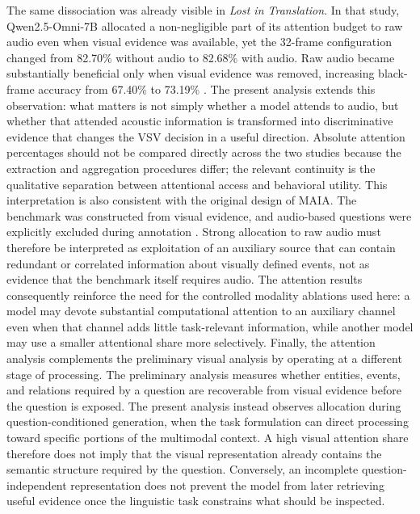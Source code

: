 The same dissociation was already visible in \textit{Lost in Translation}. In that study, Qwen2.5-Omni-7B allocated a non-negligible part of its attention budget to raw audio even when visual evidence was available, yet the 32-frame configuration changed from 82.70\% without audio to 82.68\% with audio. Raw audio became substantially beneficial only when visual evidence was removed, increasing black-frame accuracy from 67.40\% to 73.19\% \cite{deodati2026lost}. The present analysis extends this observation: what matters is not simply whether a model attends to audio, but whether that attended acoustic information is transformed into discriminative evidence that changes the VSV decision in a useful direction. Absolute attention percentages should not be compared directly across the two studies because the extraction and aggregation procedures differ; the relevant continuity is the qualitative separation between attentional access and behavioral utility.
This interpretation is also consistent with the original design of MAIA. The benchmark was constructed from visual evidence, and audio-based questions were explicitly excluded during annotation \cite{testa2025maia}. Strong allocation to raw audio must therefore be interpreted as exploitation of an auxiliary source that can contain redundant or correlated information about visually defined events, not as evidence that the benchmark itself requires audio. The attention results consequently reinforce the need for the controlled modality ablations used here: a model may devote substantial computational attention to an auxiliary channel even when that channel adds little task-relevant information, while another model may use a smaller attentional share more selectively.
Finally, the attention analysis complements the preliminary visual analysis by operating at a different stage of processing. The preliminary analysis measures whether entities, events, and relations required by a question are recoverable from visual evidence before the question is exposed. The present analysis instead observes allocation during question-conditioned generation, when the task formulation can direct processing toward specific portions of the multimodal context. A high visual attention share therefore does not imply that the visual representation already contains the semantic structure required by the question. Conversely, an incomplete question-independent representation does not prevent the model from later retrieving useful evidence once the linguistic task constrains what should be inspected.